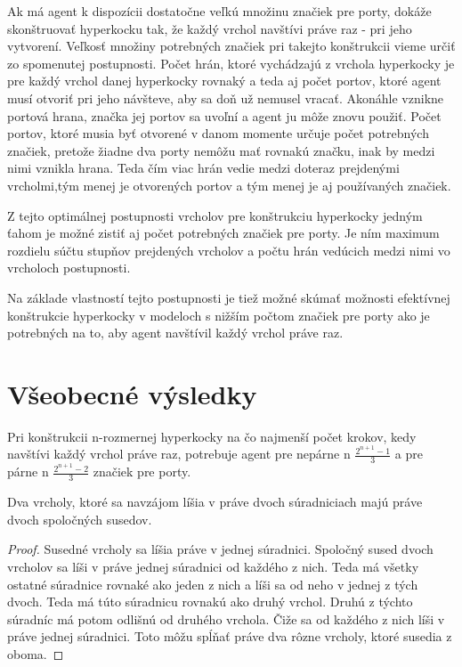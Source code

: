 Ak má agent k dispozícii dostatočne veľkú množinu značiek pre porty, dokáže
skonštruovať hyperkocku tak, že každý vrchol navštívi práve raz - pri jeho
vytvorení. Veľkosť množiny potrebných značiek pri takejto konštrukcii vieme 
určiť zo spomenutej postupnosti. Počet hrán, ktoré vychádzajú z vrchola
hyperkocky je pre každý vrchol danej hyperkocky rovnaký a teda aj počet portov, 
ktoré agent musí otvoriť pri jeho návšteve, aby sa doň už nemusel vracať. 
Akonáhle vznikne portová hrana, značka jej portov
sa uvoľní a agent ju môže znovu použiť. Počet portov, ktoré musia byť
otvorené v danom momente určuje počet potrebných značiek, pretože
žiadne dva porty nemôžu mať rovnakú značku, inak by medzi nimi vznikla hrana. 
Teda
čím viac hrán vedie medzi doteraz prejdenými vrcholmi,tým menej je
otvorených portov a tým menej je aj používaných značiek.

Z tejto optimálnej postupnosti vrcholov pre konštrukciu hyperkocky jedným
ťahom je možné zistiť aj počet potrebných značiek pre porty.
Je ním maximum rozdielu súčtu stupňov
prejdených vrcholov a počtu hrán vedúcich medzi nimi vo vrcholoch
postupnosti.

Na základe vlastností tejto postupnosti je tiež možné skúmať možnosti
efektívnej konštrukcie hyperkocky v modeloch s nižším počtom značiek pre
porty ako je potrebných na to, aby agent navštívil každý vrchol práve raz.

\section{Všeobecné výsledky}
\begin{veta}
\label{hlavna} 
Pri konštrukcii n-rozmernej hyperkocky na čo najmenší počet krokov, kedy
navštívi každý vrchol práve raz, potrebuje
agent pre 
nepárne n $\frac{2^{n+1} - 1}{3}$ a pre
párne n $\frac{2^{n+1} - 2}{3}$ značiek pre porty.
\end{veta}

\begin{lem}
Dva vrcholy, ktoré sa navzájom líšia v práve dvoch súradniciach majú práve dvoch
spoločných susedov.
\end{lem}
\begin{proof}
Susedné vrcholy sa líšia práve v jednej súradnici. Spoločný sused dvoch
vrcholov sa líši v práve jednej súradnici od každého z nich. Teda má všetky
ostatné súradnice rovnaké ako jeden z nich a líši sa od neho v jednej z tých 
dvoch. Teda má túto súradnicu rovnakú ako druhý vrchol. 
Druhú z týchto súradníc má potom odlišnú od
druhého vrchola. Čiže sa od každého z nich líši v práve jednej súradnici.
Toto môžu spĺňať práve dva rôzne vrcholy, ktoré susedia z oboma.
\end{proof}

